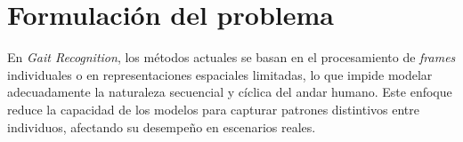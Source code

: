 \section{Formulación del problema}

En \textit{Gait Recognition}, los métodos actuales se basan en el procesamiento de \textit{frames} individuales o en representaciones espaciales limitadas, lo que impide modelar adecuadamente la naturaleza secuencial y cíclica del andar humano. Este enfoque reduce la capacidad de los modelos para capturar patrones distintivos entre individuos, afectando su desempeño en escenarios reales.

